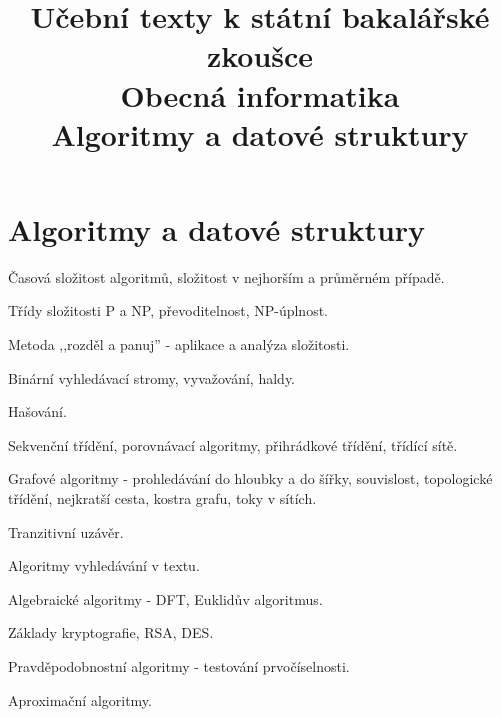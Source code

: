 \clearpage  \clearpage
\title{\LARGE Učební texty k státní bakalářské zkoušce \\ Obecná informatika \\ Algoritmy a datové struktury}

\maketitle
\newpage
\setcounter{section}{2}
\section{Algoritmy a datové struktury}
\begin{pozadavky}
\begin{pitemize}
\item Časová složitost algoritmů, složitost v nejhorším a průměrném případě.
\item Třídy složitosti P a NP, převoditelnost, NP-úplnost.
\item Metoda ,,rozděl a panuj'' - aplikace a analýza složitosti.
\item Binární vyhledávací stromy, vyvažování, haldy.
\item Hašování.
\item Sekvenční třídění, porovnávací algoritmy, přihrádkové třídění, třídící sítě.
\item Grafové algoritmy - prohledávání do hloubky a do šířky, souvislost, topologické třídění, nejkratší cesta, kostra grafu, toky v sítích.
\item Tranzitivní uzávěr.
\item Algoritmy vyhledávání v textu.
\item Algebraické algoritmy - DFT, Euklidův algoritmus.
\item Základy kryptografie, RSA, DES.
\item Pravděpodobnostní algoritmy - testování prvočíselnosti.
\item Aproximační algoritmy.
\end{pitemize}
\end{pozadavky}





